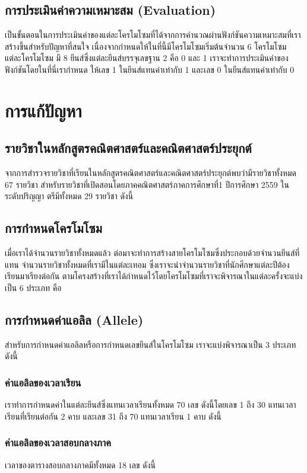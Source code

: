 \documentclass[a4paper,12pt,oneside]{book}
\begin{document}
\section{การประเมินค่าความเหมาะสม (Evaluation)}
เป็นขั้นตอนในการประเมินค่าของแต่ละโครโมโซมที่ได้จากการคำนวณผ่านฟังก์ชันความเหมาะสมที่เรา
สร้างขึ้นสำหรับปัญหาที่สนใจ เนื่องจากกำหนดให้ในที่นี้มีโครโมโซมเริ่มต้นจำนวน 6 โครโมโซม แต่ละโครโมโซม
มี 8 ยีนส์ซึ่งแต่ละยีนส์บรรจุเลขฐาน 2 คือ 0 และ 1 เราจะทำการประเมินค่าของฟังก์ชันโดยในที่นี่เรากำหนด
ให้เลข 1 ในยีนส์แทนค่าเท่ากับ 1 และเลข 0 ในยีนส์แทนค่าเท่ากับ 0

\chapter{การแก้ปัญหา}
\section{รายวิชาในหลักสูตรคณิตศาสตร์และคณิตศาสตร์ประยุกต์}
จากการสำรวจรายวิชาที่เรียนในหลักสูตรคณิตศาสตร์และคณิตศาสตร์ประยุกต์พบว่ามีรายวิชาทั้งหมด
67 รายวิชา สำหรับรายวิชาที่เปิดสอนโดยภาคคณิตศาสตร์ภาคการศึกษาที่1 ปีการศึกษา 2559 ในระดับปริญญา
ตรีมีทั้งหมด 29 รายวิชา ดังนี้
\section{การกำหนดโครโมโซม}
เมื่อเราได้จำนวนรายวิชาทั้งหมดแล้ว ต่อมาจะทำการสร้างสายโครโมโซมซึ่งประกอบด้วยจำนวนยีนส์ที่แทน
จำนวนรายวิชาทั้งหมดที่เรามีในแต่ละเทอม ซึ่งเราจะนำจำนวนรายวิชาที่นักศึกษาแต่ละปีต้องเรียนมาเรียงต่อกัน
ตามโครงสร้างที่เราได้กำหนดไว้โดยโครโมโซมที่เราจะพิจารณาในแต่ละครั้งจะแบ่งเป็น 6 ประเภท คือ
\section{การกำหนดค่าแอลิล (Allele)}
สำหรับการกำหนดค่าแอลิลหรือการกำหนดเลขยีนส์ในโครโมโซม \cite{wutt}  เราจะแบ่งพิจารณาเป็น 3 ประเภท ดังนี้
\subsection{ค่าแอลิลของเวลาเรียน}
เราทำการกำหนดค่าในแต่ละยีนส์ซึ่งแทนเวลาเรียนทั้งหมด 70 เลข ดังนี้โดยเลข 1 ถึง 30 แทนเวลา
เรียนที่เรียนต่อกัน 2 คาบ และเลข 31 ถึง 70 แทนเวลาเรียน 1 คาบ ดังนี้
\subsection{ค่าแอลิลของเวลาสอบกลางภาค}
เวลาของตารางสอบกลางภาคมีทั้งหมด 18 เลข ดังนี้
\end{document}

